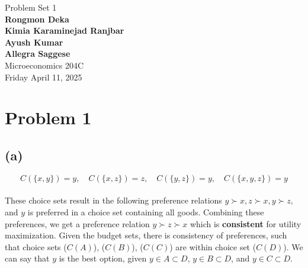 \documentclass{article}
\begin{document}
\begin{titlepage}
    \centering
    \vspace*{1in} 
    {\Large Problem Set 1} \\[1.5cm] %


    {\large \textbf{Rongmon Deka \\
    Kimia Karaminejad Ranjbar \\
    Ayush Kumar \\
    Allegra Saggese}} \\[0.75cm] %
    {\Large Microeconomics 204C} \\[1.5cm]

    {\large Friday April 11, 2025} %
    \\[2cm] 

\end{titlepage}

\section*{Problem 1} %

\subsection*{(a)}

\[
C(\{x, y\}) = y, \quad C(\{x, z\}) = z, \quad C(\{y, z\}) = y, \quad C(\{x, y, z\}) = y
\]
\\
These choice sets result in the following preference relations $ y \succ x, z \succ x, y \succ z,$ and $y$ is preferred in a choice set containing all goods. Combining these preferences, we get a preference relation $y \succ z \succ x$ which is \textbf{consistent} for utility maximization. Given the budget sets, there is consistency of preferences, such that choice sets ($C(A)$), ($C(B)$), ($C(C)$) are within choice set ($C(D)$). We can say that $y$ is the best option, given $y \in A \subset D$, $y \in B \subset D$, and $y \in C \subset D$.  
\end{document}
